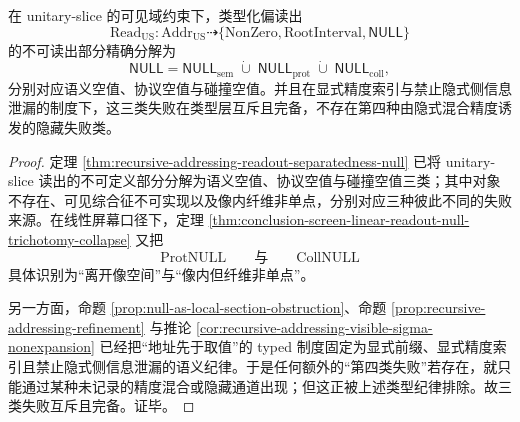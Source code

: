 \begin{theorem}\label{thm:conclusion-readus-null-trichotomy-normal-form}
在 unitary-slice 的可见域约束下，类型化偏读出
\[
\mathrm{Read}_{\mathrm{US}}:\mathrm{Addr}_{\mathrm{US}}\dashrightarrow
\{\mathrm{NonZero},\mathrm{RootInterval},\mathsf{NULL}\}
\]
的不可读出部分精确分解为
\[
\mathsf{NULL}
=
\mathsf{NULL}_{\mathrm{sem}}
\;\dot\cup\;
\mathsf{NULL}_{\mathrm{prot}}
\;\dot\cup\;
\mathsf{NULL}_{\mathrm{coll}},
\]
分别对应语义空值、协议空值与碰撞空值。并且在显式精度索引与禁止隐式侧信息泄漏的制度下，这三类失败在类型层互斥且完备，不存在第四种由隐式混合精度诱发的隐藏失败类。
\end{theorem}
\begin{proof}
定理 \ref{thm:recursive-addressing-readout-separatedness-null} 已将 unitary-slice 读出的不可定义部分分解为语义空值、协议空值与碰撞空值三类；其中对象不存在、可见综合征不可实现以及像内纤维非单点，分别对应三种彼此不同的失败来源。在线性屏幕口径下，定理 \ref{thm:conclusion-screen-linear-readout-null-trichotomy-collapse} 又把
\[
\mathrm{ProtNULL}
\qquad\text{与}\qquad
\mathrm{CollNULL}
\]
具体识别为“离开像空间”与“像内但纤维非单点”。

另一方面，命题 \ref{prop:null-as-local-section-obstruction}、命题 \ref{prop:recursive-addressing-refinement} 与推论 \ref{cor:recursive-addressing-visible-sigma-nonexpansion} 已经把“地址先于取值”的 typed 制度固定为显式前缀、显式精度索引且禁止隐式侧信息泄漏的语义纪律。于是任何额外的“第四类失败”若存在，就只能通过某种未记录的精度混合或隐藏通道出现；但这正被上述类型纪律排除。故三类失败互斥且完备。证毕。
\end{proof}

